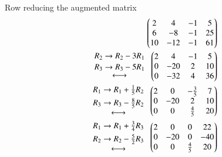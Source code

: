 \documentclass[journal,12pt,twocolumn]{IEEEtran}
\begin{document}
Row reducing the augmented matrix
\begin{align}
    \begin{pmatrix} 2 & 4 & -1 & 5 \\ 6 & -8 & -1 & 25 \\ 10 & -12 & -1 & 61  \end{pmatrix} \\
     \begin{array}{c}
     \genfrac{}{}{0pt}{0}{R_2 \rightarrow R_2 - 3 R_1}{R_3 \rightarrow R_3 - 5 R_1} \\  \longleftrightarrow
     \end{array}
    \begin{pmatrix} 2 & 4 & -1 & 5 \\ 0 & -20 & 2 & 10 \\ 0 & -32 & 4 & 36  \end{pmatrix} \\
    \begin{array}{c}
     \genfrac{}{}{0pt}{0}{R_1 \rightarrow R_1 + \frac{1}{5} R_2}{R_3 \rightarrow R_3 - \frac{8}{5} R_2} \\  \longleftrightarrow
     \end{array}
    \begin{pmatrix} 2 & 0 & -\frac{3}{5} & 7 \\ 0 & -20 & 2 & 10 \\ 0 & 0 & \frac{4}{5} & 20  \end{pmatrix} \\
    \begin{array}{c}
     \genfrac{}{}{0pt}{0}{R_1 \rightarrow R_1 + \frac{3}{4} R_3}{R_2 \rightarrow R_2 - \frac{5}{2} R_3} \\  \longleftrightarrow
     \end{array}
    \begin{pmatrix} 2 & 0 & 0 & 22 \\ 0 & -20 & 0 & -40 \\ 0 & 0 & \frac{4}{5} & 20  \end{pmatrix}
\end{align}
\end{document}
